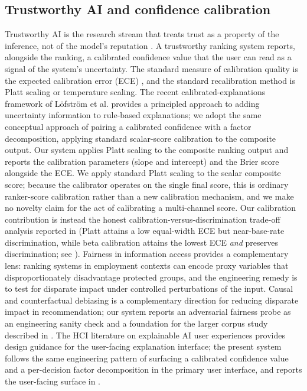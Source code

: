 \subsection{Trustworthy AI and confidence calibration}
Trustworthy AI is the research stream that treats trust as a property of the inference, not of the model's reputation \citep{liu2020trust,pu2007trust}.
A trustworthy ranking system reports, alongside the ranking, a calibrated confidence value that the user can read as a signal of the system's uncertainty.
The standard measure of calibration quality is the expected calibration error (ECE) \citep{guo2017calibration}, and the standard recalibration method is Platt scaling \citep{platt1999probabilistic} or temperature scaling.
The recent calibrated-explanations framework of L\"ofstr\"om et al. \citep{lofstrom2024calibrated} provides a principled approach to adding uncertainty information to rule-based explanations; we adopt the same conceptual approach of pairing a calibrated confidence with a factor decomposition, applying standard scalar-score calibration to the composite output.
Our system applies Platt scaling to the composite ranking output and reports the calibration parameters (slope and intercept) and the Brier score \citep{brier1950verification} alongside the ECE.
We apply standard Platt scaling to the scalar composite score; because the calibrator operates on the single final score, this is ordinary ranker-score calibration rather than a new calibration mechanism, and we make no novelty claim for the act of calibrating a multi-channel score. Our calibration contribution is instead the honest calibration-versus-discrimination trade-off analysis reported in  (Platt attains a low equal-width ECE but near-base-rate discrimination, while beta calibration attains the lowest ECE \emph{and} preserves discrimination; see ).
Fairness in information access \citep{ekstrand2021rethinking} provides a complementary lens: ranking systems in employment contexts can encode proxy variables that disproportionately disadvantage protected groups, and the engineering remedy is to test for disparate impact under controlled perturbations of the input.
Causal and counterfactual debiasing is a complementary direction for reducing disparate impact in recommendation; our system reports an adversarial fairness probe as an engineering sanity check and a foundation for the larger corpus study described in .
The HCI literature on explainable AI user experiences \citep{amershi2019guidelines,liao2020questioning} provides design guidance for the user-facing explanation interface; the present system follows the same engineering pattern of surfacing a calibrated confidence value and a per-decision factor decomposition in the primary user interface, and reports the user-facing surface in .

